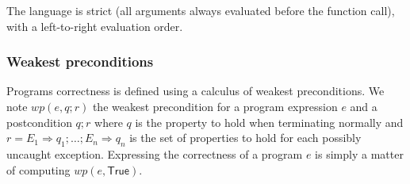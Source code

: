 \documentclass[a4paper,12pt]{report}
\begin{document}
The language is strict (all arguments always evaluated before the
function call), with a left-to-right evaluation order.


\subsubsection{Weakest preconditions}\label{wp}

\renewcommand{\wpre}[2]{\ensuremath{\mathit{wp}(#1,#2)}}
\renewcommand{\wprx}[3]{\ensuremath{\mathit{wp}(#1,#2;#3)}}
\newcommand{\unref}[1]{#1}
\newcommand{\old}[1]{\ensuremath{\mathtt{old}(#1)}}
\newcommand{\at}[2]{\ensuremath{\mathtt{at}(#1,#2)}}

Programs correctness is defined using a calculus of weakest
preconditions. We note $\wprx{e}{q}{r}$ the weakest precondition for a
program expression $e$ and a postcondition $q;r$ where $q$ is the
property to hold when terminating normally and $r = E_1\Rightarrow
q_1; \dots; E_n\Rightarrow q_n$ is the set of properties to hold for
each possibly uncaught exception.
Expressing the correctness of a program $e$ is simply a matter of
computing $\wpre{e}{\textsf{True}}$.
\end{document}
